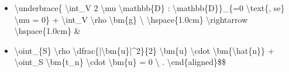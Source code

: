 \documentclass[letterpaper,10pt,italian]{jupyterBook}
\begin{document}
\begin{itemize}
\item {} 
\sphinxAtStartPar
\textbackslash{}underbrace\{ \textbackslash{}int\_V 2 \textbackslash{}mu \textbackslash{}mathbb\{D\} : \textbackslash{}mathbb\{D\}\}\_\{=0 \textbackslash{}text\{, se\} \textbackslash{}mu = 0\} + \textbackslash{}int\_V \textbackslash{}rho \textbackslash{}bm\{g\} \textbackslash{}
\textbackslash{}hspace\{1.0cm\} \textbackslash{}rightarrow \textbackslash{}hspace\{1.0cm\}  \&

\item {} 
\sphinxAtStartPar
\textbackslash{}oint\_\{S\} \textbackslash{}rho \textbackslash{}dfrac\{|\textbackslash{}bm\{u\}|\textasciicircum{}2\}\{2\} \textbackslash{}bm\{u\} \textbackslash{}cdot \textbackslash{}bm\{\textbackslash{}hat\{n\}\} + \textbackslash{}oint\_S \textbackslash{}bm\{t\_n\} \textbackslash{}cdot \textbackslash{}bm\{u\} = 0 \textbackslash{} .
\textbackslash{}end\{aligned\}\$\$

\end{itemize}
\end{document}
